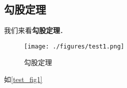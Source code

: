 
\subsection{勾股定理}
我们来看\textbf{勾股定理}．

\begin{figure}[ht]
\centering
\texttt{[image: ./figures/test1.png]}
\caption{勾股定理} \label{test_fig1}
\end{figure}

如\autoref{test_fig1}